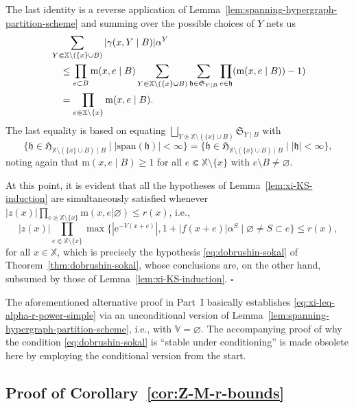 \documentclass[reqno, 11pt]{amsart}
\theoremstyle{definition}
\newcommand{\e}{\mathrm{e}}
\newcommand{\X}{\mathbb X}
\newcommand{\V}{\mathbb V}
\begin{document}
The last identity is a reverse application of Lemma~\ref{lem:spanning-hypergraph-partition-scheme} and summing over the possible choices of $Y$ nets us
\begin{align}
	& \sum_{Y \Subset \X \setminus (\{x\} \cup B)} |\gamma(x, Y \mid B)| \alpha^Y \notag \\
	& \quad \leq \prod_{e \subset B} \mathrm{m}(x, e \mid B) \sum_{Y \Subset \X \setminus (\{x\} \cup B)} \sum_{\mathfrak h \in \mathfrak S_{Y \mid B}} \prod_{e \in \mathfrak h} (\mathrm{m}(x, e \mid B)) - 1) \notag \\
	& \quad = \prod_{e \Subset \X \setminus \{x\}} \mathrm{m}(x, e \mid B). \label{eq:sum-gamma-alpha-leq-Gamma-alpha}
\end{align}
The last equality is based on equating $\bigsqcup_{Y \Subset \X \setminus (\{x\} \cup B)} \mathfrak S_{Y \mid B}$ with
\[
	 \{\mathfrak h \in \mathfrak H_{\X \setminus (\{x\} \cup B) \mid B} \mid |\mathrm{span}(\mathfrak h)| < \infty\} = \{\mathfrak h \in \mathfrak H_{\X \setminus (\{x\} \cup B) \mid B} \mid |\mathfrak h| < \infty\},
\]
noting again that $\mathrm{m}(x, e \mid B) \geq 1$ for all $e \Subset \X \setminus \{x\}$ with $e \setminus B \neq \varnothing$.

At this point, it is evident that all the hypotheses of Lemma~\ref{lem:xi-KS-induction} are simultaneously satisfied whenever $|z(x)| \prod_{e \Subset \X \setminus \{x\}} \mathrm{m}(x, e | \varnothing) \leq r(x)$, i.e.,
\[
	|z(x)| \prod_{e \Subset \X \setminus \{x\}} \max\{|\e^{-V(x+e)}|, 1 + |f(x + e)| \alpha^S \mid \varnothing \neq S \subset e\} \leq r(x),
\]
for all $x \in \X$, which is precisely the hypothesis \eqref{eq:dobrushin-sokal} of Theorem~\ref{thm:dobrushin-sokal}, whose conclusions are, on the other hand, subsumed by those of Lemma~\ref{lem:xi-KS-induction}.
\hfill $\square$
\medskip

The aforementioned alternative proof in Part~I basically establishes \eqref{eq:xi-leq-alpha-r-power-simple} via an unconditional version of Lemma~\ref{lem:spanning-hypergraph-partition-scheme}, i.e., with $\V = \varnothing$. 
The accompanying proof of why the condition \eqref{eq:dobrushin-sokal} is ``stable under conditioning'' is made obsolete here by employing the conditional version from the start.

\subsection{Proof of Corollary~\ref{cor:Z-M-r-bounds}}
\end{document}
